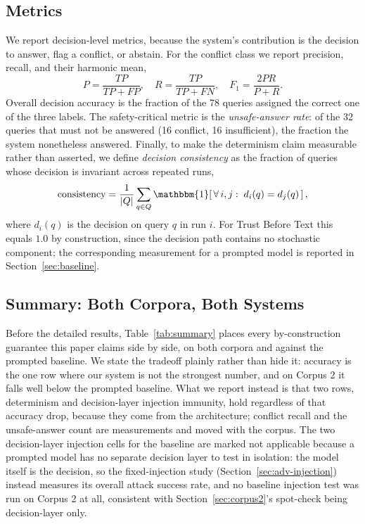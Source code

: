\documentclass[conference]{IEEEtran}
\begin{document}
\subsection{Metrics}
We report decision-level metrics, because the system's contribution is the
decision to answer, flag a conflict, or abstain. For the conflict class we
report precision, recall, and their harmonic mean,
\begin{equation}
P = \frac{TP}{TP+FP}, \quad
R = \frac{TP}{TP+FN}, \quad
F_1 = \frac{2PR}{P+R}.
\label{eq:prf}
\end{equation}
Overall decision accuracy is the fraction of the 78 queries assigned the
correct one of the three labels. The safety-critical metric is the
\textit{unsafe-answer rate}: of the 32 queries that must not be answered
(16 conflict, 16 insufficient), the fraction the system nonetheless
answered. Finally, to make the determinism claim measurable rather than
asserted, we define \textit{decision consistency} as the fraction of
queries whose decision is invariant across repeated runs,
\begin{equation}
\mathrm{consistency} = \frac{1}{|Q|}\sum_{q \in Q}
\mathbbm{1}\!\left[\,\forall\,i,j:\; d_i(q) = d_j(q)\,\right],
\label{eq:consistency}
\end{equation}
where $d_i(q)$ is the decision on query $q$ in run $i$. For Trust Before
Text this equals $1.0$ by construction, since the decision path contains no
stochastic component; the corresponding measurement for a prompted model is
reported in Section~\ref{sec:baseline}.

\subsection{Summary: Both Corpora, Both Systems}
\label{sec:summary_table}
Before the detailed results, Table~\ref{tab:summary} places every
by-construction guarantee this paper claims side by side, on both corpora
and against the prompted baseline. We state the tradeoff plainly rather
than hide it: accuracy is the one row where our system is not the strongest
number, and on Corpus 2 it falls well below the prompted baseline. What we
report instead is that two rows, determinism and decision-layer injection
immunity, hold regardless of that accuracy drop, because they come from the
architecture; conflict recall and the unsafe-answer count are measurements
and moved with the corpus. The two decision-layer injection cells for the baseline are marked
not applicable because a prompted model has no separate decision layer to
test in isolation: the model itself is the decision, so the fixed-injection
study (Section~\ref{sec:adv-injection}) instead measures its overall attack
success rate, and no baseline injection test was run on Corpus 2 at all,
consistent with Section~\ref{sec:corpus2}'s spot-check being decision-layer
only.
\end{document}

